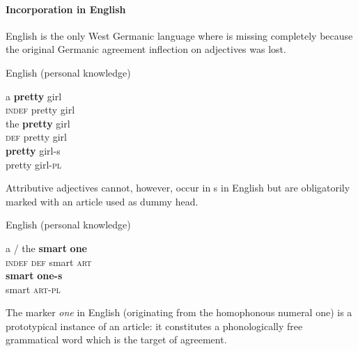 \paragraph*{Incorporation in English}
English is the only West Germanic language where  is missing completely because the original Germanic agreement inflection on adjectives was lost. 
\begin{exe}
\ex \rm{English (personal knowledge)}
\begin{xlist}
\ex 
\gll	a \textbf{pretty} girl\\
	\textsc{indef} pretty girl\\
\ex
\gll	the \textbf{pretty} girl\\
	\textsc{def} pretty girl\\
\ex 
\gll	\textbf{pretty} girl-s\\
	pretty girl-\textsc{pl}\\
\end{xlist}
\end{exe}
Attributive adjectives cannot, however, occur in s in English but are obligatorily marked with an article used as dummy head.
\begin{exe}
\ex \rm{English (personal knowledge)}
\begin{xlist}
\ex
\gll	a / the \textbf{smart} \textbf{one}\\
	\textsc{indef} {} \textsc{def} smart \textsc{art}\\
\ex	
\gll	\textbf{smart} \textbf{one-s}\\
	smart \textsc{art}-\textsc{pl}\\
\end{xlist}
\end{exe}
The marker \textit{one} in English (originating from the homophonous numeral one) is a prototypical instance of an article: it constitutes a phonologically free grammatical word which is the target of agreement. 

